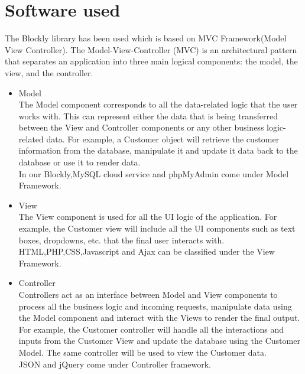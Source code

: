 \documentclass[a4paper,12pt,oneside]{book}
\begin{document}




\newpage\section{Software used}
The Blockly library has been used which is based on MVC Framework(Model View Controller).
The Model-View-Controller (MVC) is an architectural pattern that separates an application into three main logical components: the model, the view, and the controller.
\begin{itemize}
\item{Model}\\
The Model component corresponds to all the data-related logic that the user works with. This can represent either the data that is being transferred between the View and Controller components or any other business logic-related data. For example, a Customer object will retrieve the customer information from the database, manipulate it and update it data back to the database or use it to render data.\\
In our Blockly,MySQL cloud service and phpMyAdmin come under Model Framework.
\item{View}\\
The View component is used for all the UI logic of the application. For example, the Customer view will include all the UI components such as text boxes, dropdowns, etc. that the final user interacts with.\\
HTML,PHP,CSS,Javascript and Ajax can be classified under the View Framework.
\item{Controller}\\
Controllers act as an interface between Model and View components to process all the business logic and incoming requests, manipulate data using the Model component and interact with the Views to render the final output. For example, the Customer controller will handle all the interactions and inputs from the Customer View and update the database using the Customer Model. The same controller will be used to view the Customer data.\\
JSON and jQuery come under Controller framework.
\end{itemize}
\end{document}
